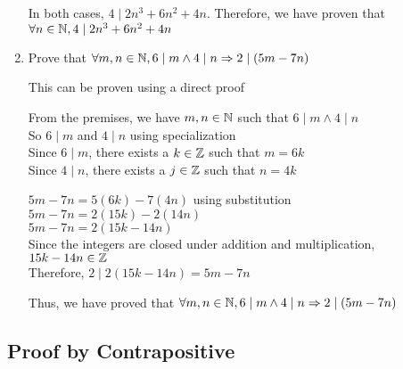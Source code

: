 \documentclass[12pt, leqno]{article}
\begin{document}
\begin{enumerate}
    In both cases, $4 \mid 2n^3 + 6n^2 + 4n$. Therefore, we have proven that $\forall n \in \mathbb N, 4 \mid 2n^3 + 6n^2 + 4n$

    \item Prove that $\forall m, n \in \mathbb N, 6 \mid m \land 4 \mid n \Rightarrow 2 \mid (5m - 7n)$

    This can be proven using a direct proof

    From the premises, we have $m, n \in \mathbb N$ such that $6 \mid m \land 4 \mid n$\\
    So $6 \mid m$ and $4 \mid n$ using specialization\\
    Since $6 \mid m$, there exists a $k \in \mathbb Z$ such that $m = 6k$\\
    Since $4 \mid n$, there exists a $j \in \mathbb Z$ such that $n = 4k$

    $5m - 7n = 5(6k) - 7(4n)$ using substitution\\
    $5m - 7n = 2(15k) - 2(14n)$\\
    $5m - 7n = 2(15k - 14n)$\\
    Since the integers are closed under addition and multiplication, $15k - 14n \in \mathbb Z$\\
    Therefore, $2 \mid 2(15k - 14n) = 5m - 7n$

    Thus, we have proved that $\forall m, n \in \mathbb N, 6 \mid m \land 4 \mid n \Rightarrow 2 \mid (5m - 7n)$
\end{enumerate}

\subsection{Proof by Contrapositive}
\end{document}
